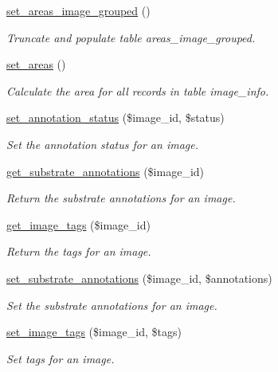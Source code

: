 \begin{DoxyCompactItemize}
\item 
\hyperlink{classDatabase_a0fba6ad55208137b25381d4b73954c2c}{set\-\_\-areas\-\_\-image\-\_\-grouped} ()
\begin{DoxyCompactList}\small\item\em Truncate and populate table {\ttfamily areas\-\_\-image\-\_\-grouped}. \end{DoxyCompactList}\item 
\hyperlink{classDatabase_afa6f84f0b79f0be0b4a81e9898c2b3e7}{set\-\_\-areas} ()
\begin{DoxyCompactList}\small\item\em Calculate the area for all records in table {\ttfamily image\-\_\-info}. \end{DoxyCompactList}\item 
\hyperlink{classDatabase_a4e89aa8e1053f8753a22572f65e0d2be}{set\-\_\-annotation\-\_\-status} (\$image\-\_\-id, \$status)
\begin{DoxyCompactList}\small\item\em Set the annotation status for an image. \end{DoxyCompactList}\item 
\hyperlink{classDatabase_adf48d605dd4622b07cc9a7f548cc5917}{get\-\_\-substrate\-\_\-annotations} (\$image\-\_\-id)
\begin{DoxyCompactList}\small\item\em Return the substrate annotations for an image. \end{DoxyCompactList}\item 
\hyperlink{classDatabase_a1e9b6dcb97dbec39092dc887db9242b2}{get\-\_\-image\-\_\-tags} (\$image\-\_\-id)
\begin{DoxyCompactList}\small\item\em Return the tags for an image. \end{DoxyCompactList}\item 
\hyperlink{classDatabase_a241720daf5ac8d79ce1283898c0a7da3}{set\-\_\-substrate\-\_\-annotations} (\$image\-\_\-id, \$annotations)
\begin{DoxyCompactList}\small\item\em Set the substrate annotations for an image. \end{DoxyCompactList}\item 
\hyperlink{classDatabase_a19ba63b5a89bb24232cd474c54b4f731}{set\-\_\-image\-\_\-tags} (\$image\-\_\-id, \$tags)
\begin{DoxyCompactList}\small\item\em Set tags for an image. \end{DoxyCompactList}\end{DoxyCompactItemize}
